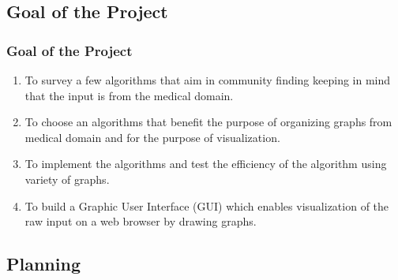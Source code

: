 \documentclass{beamer}
\begin{document}
\subsection{Goal of the Project}
\frame
{
	\frametitle{Goal of the Project}
	\begin{enumerate}
\item To survey a few algorithms that aim in community finding keeping in mind that the input is from the medical domain. 
\item To choose an algorithms that benefit the purpose of organizing graphs from medical domain and for the purpose of visualization.
\item To implement the algorithms and test the efficiency of the algorithm using variety of graphs.
\item To build a Graphic User Interface (GUI) which enables visualization of the raw input on a web browser by drawing graphs.

\end{enumerate}
}
\subsection{Planning}

\end{document}
